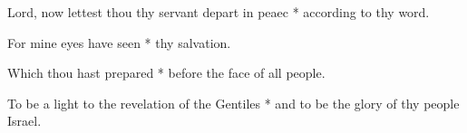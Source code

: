\begin{multicols}{2}
	
	Lord, now lettest thou thy servant depart in peaec * according to thy word.
	
	For mine eyes have seen * thy salvation.
	
	Which thou hast prepared * before the face of all people.
	
	To be a light to the revelation of the Gentiles * and to be the glory of thy people Israel.
	
	\gloria{}
\end{multicols}